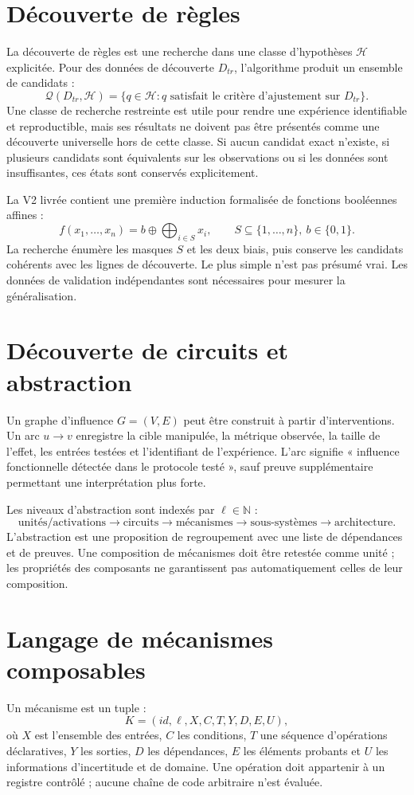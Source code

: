 \documentclass[11pt,a4paper]{article}
\begin{document}
\section{Découverte de règles}
La découverte de règles est une recherche dans une classe d'hypothèses $\mathcal{H}$ explicitée. Pour des données de découverte $D_{tr}$, l'algorithme produit un ensemble de candidats :
\[
\mathcal{Q}(D_{tr},\mathcal{H})=\{q\in\mathcal{H}: q\text{ satisfait le critère d'ajustement sur }D_{tr}\}.
\]
Une classe de recherche restreinte est utile pour rendre une expérience identifiable et reproductible, mais ses résultats ne doivent pas être présentés comme une découverte universelle hors de cette classe. Si aucun candidat exact n'existe, si plusieurs candidats sont équivalents sur les observations ou si les données sont insuffisantes, ces états sont conservés explicitement.

La V2 livrée contient une première induction formalisée de fonctions booléennes affines :
\[
f(x_1,\ldots,x_n)=b\oplus\bigoplus_{i\in S}x_i,
\qquad S\subseteq\{1,\ldots,n\},\ b\in\{0,1\}.
\]
La recherche énumère les masques $S$ et les deux biais, puis conserve les candidats cohérents avec les lignes de découverte. Le plus simple n'est pas présumé vrai. Les données de validation indépendantes sont nécessaires pour mesurer la généralisation.

\section{Découverte de circuits et abstraction}
Un graphe d'influence $G=(V,E)$ peut être construit à partir d'interventions. Un arc $u\to v$ enregistre la cible manipulée, la métrique observée, la taille de l'effet, les entrées testées et l'identifiant de l'expérience. L'arc signifie « influence fonctionnelle détectée dans le protocole testé », sauf preuve supplémentaire permettant une interprétation plus forte.

Les niveaux d'abstraction sont indexés par $\ell\in\mathbb{N}$ :
\[
\text{unités/activations}\to\text{circuits}\to\text{mécanismes}\to\text{sous-systèmes}\to\text{architecture}.
\]
L'abstraction est une proposition de regroupement avec une liste de dépendances et de preuves. Une composition de mécanismes doit être retestée comme unité ; les propriétés des composants ne garantissent pas automatiquement celles de leur composition.

\section{Langage de mécanismes composables}
Un mécanisme est un tuple :
\[
K=(id,\ell,X,C,T,Y,D,E,U),
\]
où $X$ est l'ensemble des entrées, $C$ les conditions, $T$ une séquence d'opérations déclaratives, $Y$ les sorties, $D$ les dépendances, $E$ les éléments probants et $U$ les informations d'incertitude et de domaine. Une opération doit appartenir à un registre contrôlé ; aucune chaîne de code arbitraire n'est évaluée.
\end{document}
